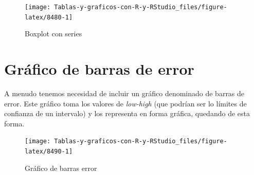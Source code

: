 \documentclass[
]{book}
\newenvironment{Shaded}{\begin{snugshade}}{\end{snugshade}}
\newcommand{\AttributeTok}[1]{\textcolor[rgb]{0.77,0.63,0.00}{#1}}
\newcommand{\ConstantTok}[1]{\textcolor[rgb]{0.00,0.00,0.00}{#1}}
\newcommand{\FunctionTok}[1]{\textcolor[rgb]{0.00,0.00,0.00}{#1}}
\newcommand{\NormalTok}[1]{#1}
\newcommand{\SpecialCharTok}[1]{\textcolor[rgb]{0.00,0.00,0.00}{#1}}
\newcommand{\StringTok}[1]{\textcolor[rgb]{0.31,0.60,0.02}{#1}}
\begin{document}
\begin{figure}[H]

{\centering \texttt{[image: Tablas-y-graficos-con-R-y-RStudio\_files/figure-latex/8480-1]} 

}

\caption{Boxplot con series}\label{fig:8480}
\end{figure}

\hypertarget{gruxe1fico-de-barras-de-error}{%
\section{Gráfico de barras de error}\label{gruxe1fico-de-barras-de-error}}

A menudo tenemos necesidad de incluir un gráfico denominado de barras de error. Este gráfico toma los valores de \emph{low-high} (que podrían ser lo límites de confianza de un intervalo) y los representa en forma gráfica, quedando de esta forma.

\begin{Shaded}
\end{Shaded}

\begin{figure}[H]

{\centering \texttt{[image: Tablas-y-graficos-con-R-y-RStudio\_files/figure-latex/8490-1]} 

}

\caption{Gráfico de barras error}\label{fig:8490}
\end{figure}
\end{document}
